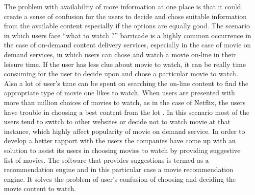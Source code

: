 The problem with availability of more information at one place is that it could create a sense of confusion for the users to decide and chose suitable information from the available content especially if the options are equally good. The scenario in which users face ``what to watch ?'' barricade is a highly common occurrence in the case of on-demand content delivery services, especially in the case of movie on demand services, in which users can chose and watch a movie on-line in their leisure time. If the user has less clue about movie to watch, it can be really time consuming for the user to decide upon and chose a particular movie to watch. Also a lot of user's time can be spent on searching the on-line content to find the appropriate type of movie one likes to watch. When users are presented with more than million choices of movies to watch, as in the case of Netflix, the users have trouble in choosing a best content from the lot \citep{flicking_online}. In this scenario most of the users tend to switch to other websites or decide not to watch movie at that instance, which highly affect popularity of movie on demand service. In order to develop a better rapport with the users the companies have come up with an solution to assist its users in choosing movies to watch by providing suggestive list of movies. The software that provides suggestions is termed as a recommendation engine and in this particular case a movie recommendation engine. It solves the problem of user's confusion of choosing and deciding the movie content to watch.

